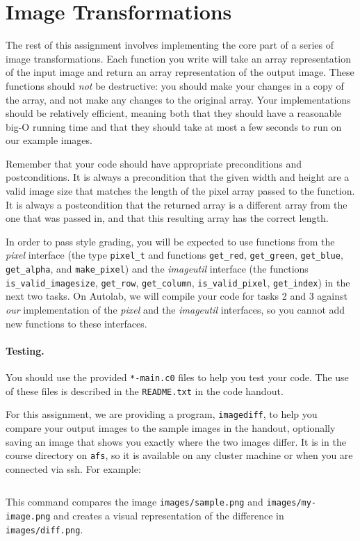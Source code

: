\documentclass[12pt]{exam}
\newcommand{\hwcolor}{blue}  %
\newcommand{\hwversion}{reflect-blur} %
\begin{document}
\section{Image Transformations}

The rest of this assignment involves implementing the core part of a
series of image transformations. Each function you write will take an
array representation of the input image and return an array
representation of the output image. These functions should {\it not}
be destructive: you should make your changes in a copy of the array,
and not make any changes to the original array. Your implementations
should be relatively efficient, meaning both that they should have a
reasonable big-O running time and that they should take at most a few
seconds to run on our example images.

Remember that your code should have appropriate preconditions and
postconditions. It is always a precondition that the given width and height
are a valid image size that matches the length of the pixel array passed to
the function. It is always a postcondition that the returned array is a
different array from the one that was passed in, and that this resulting array
has the correct length.

In order to pass style grading, you will be expected to use functions
from the \emph{pixel} interface (the type \lstinline'pixel_t' and
functions \lstinline'get_red', \lstinline'get_green',
\lstinline'get_blue', \lstinline'get_alpha', and
\lstinline'make_pixel') and the \emph{imageutil} interface (the
functions \lstinline'is_valid_imagesize', \lstinline'get_row',
\lstinline'get_column', \lstinline'is_valid_pixel',
\lstinline'get_index') in the next two tasks.  On Autolab, we will
compile your code for tasks 2 and 3 against \emph{our} implementation
of the \emph{pixel} and the \emph{imageutil} interfaces, so you cannot add
new functions to these interfaces.


\paragraph{Testing.}
You should use the provided \lstinline'*-main.c0' files to help you test
your code. The use of these files is described in the
\lstinline'README.txt' in the code handout.

For this assignment, we are providing a program,
\lstinline'imagediff', to help you compare your output images to the
sample images in the handout, optionally saving an image that shows
you exactly where the two images differ. It is in the course directory
on \lstinline'afs', so it is available on any cluster machine or when you
are connected via ssh. For example:
\begin{lstlisting}[language={[coin]C}]
% imagediff -i images/sample.png -j images/my-image.png -o images/diff.png
\end{lstlisting}
This command compares the image \lstinline'images/sample.png' and
\lstinline'images/my-image.png' and creates a visual representation of the
difference in \lstinline'images/diff.png'.





\ifdefstring{\hwversion}{rotate-mask}{
\clearpage
\clearpage
}{}
\ifdefstring{\hwversion}{reflect-blur}{
\clearpage
\clearpage
}{}

\clearpage


%
%
\end{document}
